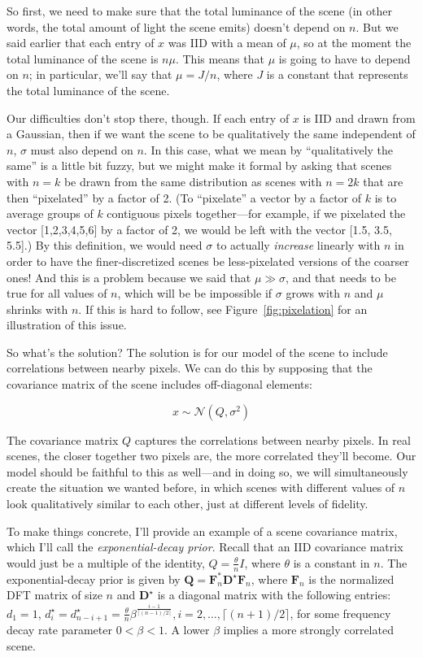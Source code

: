 So first, we need to make sure that the total luminance of the scene (in other words, the total amount of light the scene emits) doesn't depend on $n$. But we said earlier that each entry of $x$ was IID with a mean of $\mu$, so at the moment the total luminance of the scene is $n \mu$. This means that $\mu$ is going to have to depend on $n$; in particular, we'll say that $\mu = J/n$, where $J$ is a constant that represents the total luminance of the scene.

Our difficulties don't stop there, though. If each entry of $x$ is IID and drawn from a Gaussian, then if we want the scene to be qualitatively the same independent of $n$, $\sigma$ must also depend on $n$. In this case, what we mean by ``qualitatively the same'' is a little bit fuzzy, but we might make it formal by asking that scenes with $n=k$ be drawn from the same distribution as scenes with $n=2k$ that are then ``pixelated'' by a factor of 2. (To ``pixelate'' a vector by a factor of $k$ is to average groups of $k$ contiguous pixels together---for example, if we pixelated the vector [1,2,3,4,5,6] by a factor of 2, we would be left with the vector [1.5, 3.5, 5.5].) By this definition, we would need $\sigma$ to actually \emph{increase} linearly with $n$ in order to have the finer-discretized scenes be less-pixelated versions of the coarser ones! And this is a problem because we said that $\mu \gg \sigma$, and that needs to be true for all values of $n$, which will be be impossible if $\sigma$ grows with $n$ and $\mu$ shrinks with $n$. If this is hard to follow, see Figure~\ref{fig:pixelation} for an illustration of this issue.

So what's the solution? The solution is for our model of the scene to include correlations between nearby pixels. We can do this by supposing that the covariance matrix of the scene includes off-diagonal elements:

$$x \sim \mathcal{N}(Q, \sigma^2)$$

The covariance matrix $Q$ captures the correlations between nearby pixels. In real scenes, the closer together two pixels are, the more correlated they'll become. Our model should be faithful to this as well---and in doing so, we will simultaneously create the situation we wanted before, in which scenes with different values of $n$ look qualitatively similar to each other, just at different levels of fidelity. 

To make things concrete, I'll provide an example of a scene covariance matrix, which I'll call the \emph{exponential-decay prior}. Recall that an IID covariance matrix would just be a multiple of the identity, $Q = \frac{\theta}{n} I$, where $\theta$ is a constant in $n$. The exponential-decay prior is given by $\mathbf{Q} = \mathbf{F}^*_n\mathbf{D}^\star\mathbf{F}_n$, where $\mathbf{F}_n$ is the normalized DFT matrix of size $n$ and $\mathbf{D}^\star$ is a diagonal matrix with the following entries: $d_1=1$, $d_i^\star = d_{n-i+1}^\star = \frac{\theta}{n}\beta^{\frac{i-1}{\lceil(n-1)/2\rceil}}, i=2,\ldots,\lceil(n+1)/2\rceil$, for some frequency decay rate parameter $0 < \beta < 1$. A lower $\beta$ implies a more strongly correlated scene.


